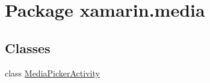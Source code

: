 \hypertarget{namespacexamarin_1_1media}{\section{Package xamarin.\+media}
\label{namespacexamarin_1_1media}
}
\subsection*{Classes}
\begin{DoxyCompactItemize}
\item 
class \hyperlink{classxamarin_1_1media_1_1_media_picker_activity}{Media\+Picker\+Activity}
\end{DoxyCompactItemize}

